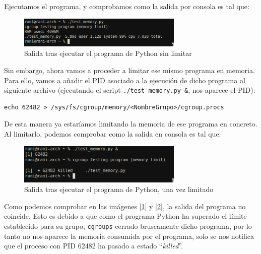 \documentclass[12pt]{article}
\begin{document}
	\noindent Ejecutamos el programa, y comprobamos como la salida por consola es tal que: 
	
	\begin{figure}[h!]
		\begin{center}
			\includegraphics[width=0.7\textwidth]{img/cgroup_python1.png}
			\caption{Salida tras ejecutar el programa de Python sin limitar}
			\label{img: cgroup python 1}
		\end{center}
	\end{figure}

	\noindent Sin embargo, ahora vamos a proceder a limitar ese mismo programa en memoria. Para ello, vamos a añadir el PID asociado a la ejecución de dicho programa al siguiente archivo (ejecutando el script \texttt{./test\_memory.py \&}, nos aparece el PID):
	\begin{verbatim}
echo 62482 > /sys/fs/cgroup/memory/<NombreGrupo>/cgroup.procs
	\end{verbatim}
	
	\noindent De esta manera ya estaríamos limitando la memoria de ese programa en concreto. Al limitarlo, podemos comprobar como la salida en consola es tal que: 
	
	\begin{figure}[h!]
		\begin{center}
			\includegraphics[width=0.7\textwidth]{img/cgroup_python2.png}
			\caption{Salida tras ejecutar el programa de Python, una vez limitado}
			\label{img: cgroup python 2}
		\end{center}
	\end{figure}

	\pagebreak
	
	\noindent Como podemos comprobar en las imágenes [\ref{img: cgroup python 1}] y [\ref{img: cgroup python 2}], la salida del programa no coincide. Esto es debido a que como el programa Python ha superado el límite establecido para su grupo, \texttt{cgroups} cerrado bruscamente dicho programa, por lo tanto no nos aparece la memoria consumida por el programa, solo se nos notifica que el proceso con PID 62482 ha pasado a estado ``\textit{killed}''. \\
	
\end{document}
